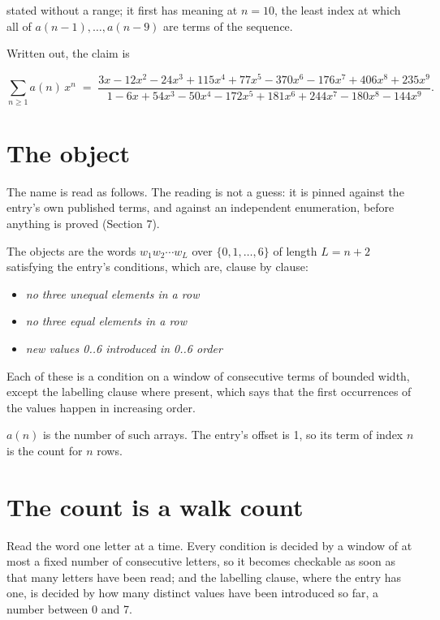 \documentclass[11pt]{article}
\theoremstyle{definition}
\begin{document}
stated without a range; it first has meaning at $n = 10$, the least index at which all of $a(n-1),\dots,a(n-9)$ are terms of the sequence.

Written out, the claim is

\[\sum_{n \ge 1} a(n)\,x^n \;=\; \frac{3x - 12x^{2} - 24x^{3} + 115x^{4} + 77x^{5} - 370x^{6} - 176x^{7} + 406x^{8} + 235x^{9}}{1 - 6x + 54x^{3} - 50x^{4} - 172x^{5} + 181x^{6} + 244x^{7} - 180x^{8} - 144x^{9}}.\]

\section{The object}

The name is read as follows. The reading is not a guess: it is pinned against the entry's own published terms, and against an independent enumeration, before anything is proved (Section 7).

The objects are the words $w_1 w_2 \cdots w_L$ over $\{0,1,\dots,6\}$ of length $L = n + 2$ satisfying the entry's conditions, which are, clause by clause:

\begin{itemize}

\item {\itshape no three unequal elements in a row}

\item {\itshape no three equal elements in a row}

\item {\itshape new values 0..6 introduced in 0..6 order}

\end{itemize}

Each of these is a condition on a window of consecutive terms of bounded width, except the labelling clause where present, which says that the first occurrences of the values happen in increasing order.

$a(n)$ is the number of such arrays. The entry's offset is 1, so its term of index $n$ is the count for $n$ rows.

\section{The count is a walk count}

Read the word one letter at a time. Every condition is decided by a window of at most a fixed number of consecutive letters, so it becomes checkable as soon as that many letters have been read; and the labelling clause, where the entry has one, is decided by how many distinct values have been introduced so far, a number between $0$ and 7.
\end{document}
